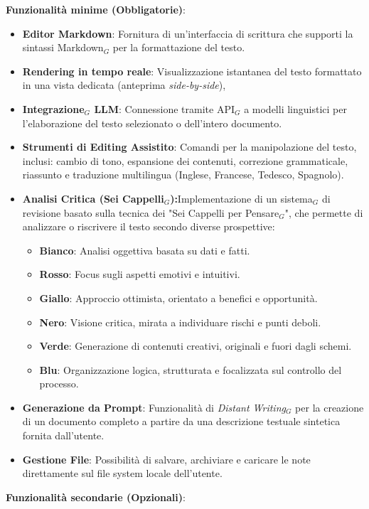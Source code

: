 \documentclass[a4paper, 10pt]{article}
\begin{document}
\textbf{Funzionalità minime (Obbligatorie)}:
\begin{itemize}
    \item \textbf{Editor Markdown}: Fornitura di un'interfaccia di scrittura che supporti la sintassi Markdown$_G$ per la formattazione del testo.
    \item \textbf{Rendering in tempo reale}: Visualizzazione istantanea del testo formattato in una vista dedicata (anteprima \textit{side-by-side}),
    \item \textbf{Integrazione$_G$ LLM}: Connessione tramite API$_G$ a modelli linguistici per l'elaborazione del testo selezionato o dell'intero documento.
    \item \textbf{Strumenti di Editing Assistito}: Comandi per la manipolazione del testo, inclusi: cambio di tono, espansione dei contenuti, correzione grammaticale, riassunto e traduzione multilingua (Inglese, Francese, Tedesco, Spagnolo).
    \item \textbf{Analisi Critica (Sei Cappelli$_G$):}\allowbreak Implementazione di un sistema$_G$ di revisione basato sulla tecnica dei "Sei Cappelli per Pensare$_G$", che permette di analizzare o riscrivere il testo secondo diverse prospettive:
    \begin{itemize}
        \item \textbf{Bianco}: Analisi oggettiva basata su dati e fatti.
        \item \textbf{Rosso}: Focus sugli aspetti emotivi e intuitivi.
        \item \textbf{Giallo}: Approccio ottimista, orientato a benefici e opportunità.
        \item \textbf{Nero}: Visione critica, mirata a individuare rischi e punti deboli.
        \item \textbf{Verde}: Generazione di contenuti creativi, originali e fuori dagli schemi.
        \item \textbf{Blu}: Organizzazione logica, strutturata e focalizzata sul controllo del processo.
    \end{itemize} 
    \item \textbf{Generazione da Prompt}: Funzionalità di \textit{Distant Writing}$_G$ per la creazione di un documento completo a partire da una descrizione testuale sintetica fornita dall'utente.
    \item \textbf{Gestione File}: Possibilità di salvare, archiviare e caricare le note direttamente sul file system locale dell'utente.
\end{itemize}
\textbf{Funzionalità secondarie (Opzionali)}:
\end{document}
